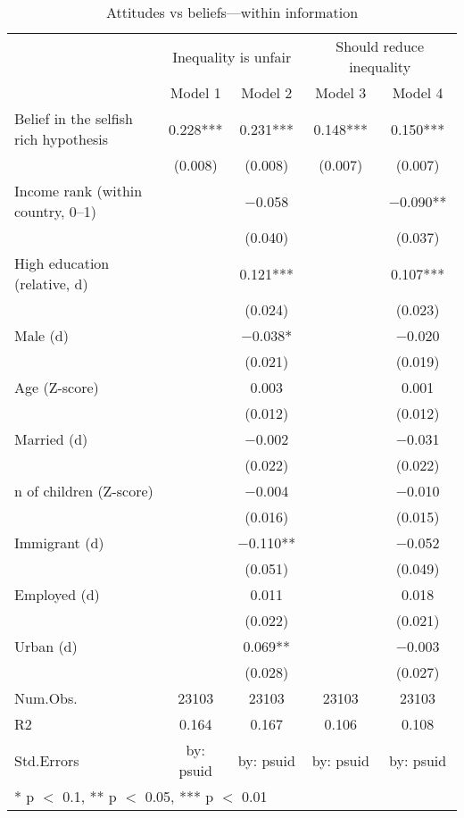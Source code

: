 \begin{table}

\caption{\label{tab:unnamed-chunk-66}Attitudes vs beliefs---within information}
\centering
\begin{tabular}[t]{lcccc}
\toprule
\multicolumn{1}{c}{ } & \multicolumn{2}{c}{Inequality is unfair} & \multicolumn{2}{c}{Should reduce inequality} \\
\cmidrule(l{3pt}r{3pt}){2-3} \cmidrule(l{3pt}r{3pt}){4-5}
  & Model 1 & Model 2 & Model 3 & Model 4\\
\midrule
Belief in the selfish rich hypothesis & \num{0.228}*** & \num{0.231}*** & \num{0.148}*** & \num{0.150}***\\
 & (\num{0.008}) & (\num{0.008}) & (\num{0.007}) & (\num{0.007})\\
Income rank (within country, 0--1) &  & \num{-0.058} &  & \num{-0.090}**\\
 &  & (\num{0.040}) &  & (\num{0.037})\\
High education (relative, d) &  & \num{0.121}*** &  & \num{0.107}***\\
 &  & (\num{0.024}) &  & (\num{0.023})\\
Male (d) &  & \num{-0.038}* &  & \num{-0.020}\\
 &  & (\num{0.021}) &  & (\num{0.019})\\
Age (Z-score) &  & \num{0.003} &  & \num{0.001}\\
 &  & (\num{0.012}) &  & (\num{0.012})\\
Married (d) &  & \num{-0.002} &  & \num{-0.031}\\
 &  & (\num{0.022}) &  & (\num{0.022})\\
n of children (Z-score) &  & \num{-0.004} &  & \num{-0.010}\\
 &  & (\num{0.016}) &  & (\num{0.015})\\
Immigrant (d) &  & \num{-0.110}** &  & \num{-0.052}\\
 &  & (\num{0.051}) &  & (\num{0.049})\\
Employed (d) &  & \num{0.011} &  & \num{0.018}\\
 &  & (\num{0.022}) &  & (\num{0.021})\\
Urban (d) &  & \num{0.069}** &  & \num{-0.003}\\
 &  & (\num{0.028}) &  & (\num{0.027})\\
\midrule
Num.Obs. & \num{23103} & \num{23103} & \num{23103} & \num{23103}\\
R2 & \num{0.164} & \num{0.167} & \num{0.106} & \num{0.108}\\
Std.Errors & by: psuid & by: psuid & by: psuid & by: psuid\\
\bottomrule
\multicolumn{5}{l}{\rule{0pt}{1em}* p $<$ 0.1, ** p $<$ 0.05, *** p $<$ 0.01}\\
\end{tabular}
\end{table}